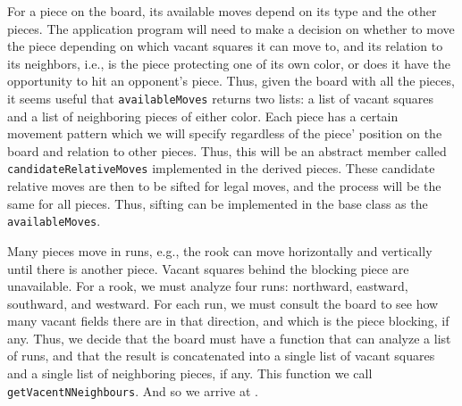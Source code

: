 \documentclass[fsharpnotes.tex]{subfiles}
\begin{document}
For a piece on the board, its available moves depend on its type and the other pieces. The application program will need to make a decision on whether to move the piece depending on which vacant squares it can move to, and its relation to its neighbors, i.e., is the piece protecting one of its own color, or does it have the opportunity to hit an opponent's piece. Thus, given the board with all the pieces, it seems useful that \lstinline{availableMoves} returns two lists: a list of vacant squares and a list of neighboring pieces of either color. Each piece has a certain movement pattern which we will specify regardless of the piece' position on the board and relation to other pieces. Thus, this will be an abstract member called \lstinline{candidateRelativeMoves} implemented in the derived pieces. These candidate relative moves are then to be sifted for legal moves, and the process will be the same for all pieces. Thus, sifting can be implemented in the base class as the \lstinline{availableMoves}.

Many pieces move in runs, e.g., the rook can move horizontally and vertically until there is another piece. Vacant squares behind the blocking piece are unavailable. For a rook, we must analyze four runs: northward, eastward, southward, and westward. For each run, we must consult the board to see how many vacant fields there are in that direction, and which is the piece blocking, if any. Thus, we decide that the board must have a function that can analyze a list of runs, and that the result is concatenated into a single list of vacant squares and a single list of neighboring pieces, if any. This function we call \lstinline{getVacentNNeighbours}. And so we arrive at .
%
%
\clearpage%
\end{document}
